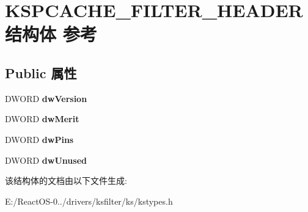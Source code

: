 \hypertarget{struct_k_s_p_c_a_c_h_e___f_i_l_t_e_r___h_e_a_d_e_r}{}\section{K\+S\+P\+C\+A\+C\+H\+E\+\_\+\+F\+I\+L\+T\+E\+R\+\_\+\+H\+E\+A\+D\+E\+R结构体 参考}
\label{struct_k_s_p_c_a_c_h_e___f_i_l_t_e_r___h_e_a_d_e_r}
\subsection*{Public 属性}
\begin{DoxyCompactItemize}
\item 
\mbox{\label{struct_k_s_p_c_a_c_h_e___f_i_l_t_e_r___h_e_a_d_e_r_a9e264b24a0e8b92f357a8d6ef3f3ee10}} 
D\+W\+O\+RD {\bfseries dw\+Version}
\item 
\mbox{\label{struct_k_s_p_c_a_c_h_e___f_i_l_t_e_r___h_e_a_d_e_r_af061a3978a1cd992b69b7dbb7a45338d}} 
D\+W\+O\+RD {\bfseries dw\+Merit}
\item 
\mbox{\label{struct_k_s_p_c_a_c_h_e___f_i_l_t_e_r___h_e_a_d_e_r_ab5d1f47f695301eb8e0608f3f698b4ae}} 
D\+W\+O\+RD {\bfseries dw\+Pins}
\item 
\mbox{\label{struct_k_s_p_c_a_c_h_e___f_i_l_t_e_r___h_e_a_d_e_r_a07e6a14d0c191d51b7371081204c0ca2}} 
D\+W\+O\+RD {\bfseries dw\+Unused}
\end{DoxyCompactItemize}


该结构体的文档由以下文件生成\+:\begin{DoxyCompactItemize}
\item 
E\+:/\+React\+O\+S-\/0../drivers/ksfilter/ks/kstypes.\+h\end{DoxyCompactItemize}
